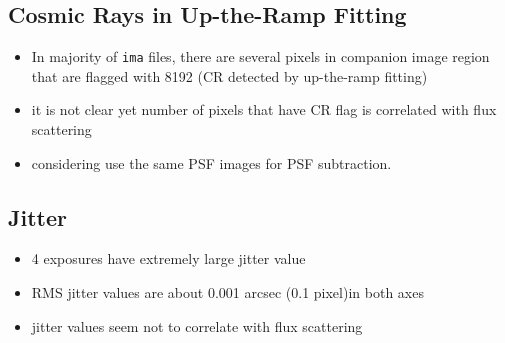 \documentclass[paper=letter, fontsize=11pt]{scrartcl} %
\numberwithin{equation}{section} %
\numberwithin{figure}{section} %
\numberwithin{table}{section} %
\begin{document}
  \subsection{Cosmic Rays in Up-the-Ramp Fitting}
  \begin{itemize}
  \item In majority of \texttt{ima} files, there are several pixels in
    companion image region that are flagged with 8192 (CR detected by
    up-the-ramp fitting)
    \item it is not clear yet number of pixels that have CR flag is
      correlated with flux scattering
    \item considering use the same PSF images for PSF subtraction.
    \end{itemize}

    \subsection{Jitter}
    \begin{itemize}
    \item 4 exposures have extremely large jitter value
     \item RMS jitter values are about 0.001 arcsec (0.1 pixel)in both
       axes
     \item jitter values seem not to correlate with flux scattering
    \end{itemize}
\end{document}
